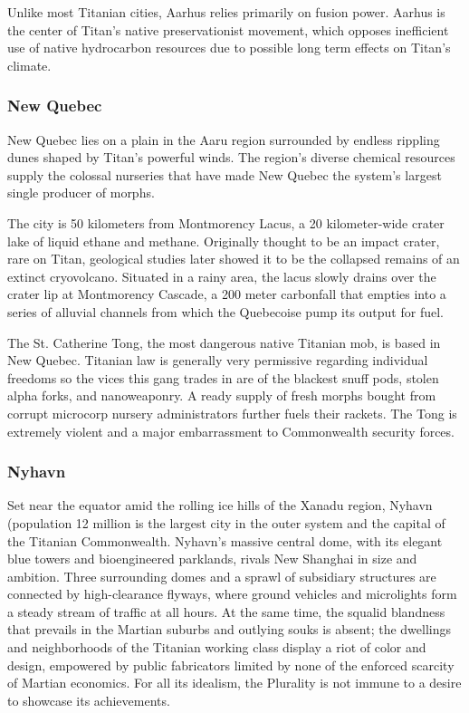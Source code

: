 Unlike most Titanian cities, Aarhus relies primarily 
on fusion power. Aarhus is the center of Titan's native 
preservationist movement, which opposes inefficient 
use of native hydrocarbon resources due to possible 
long term effects on Titan's climate.

\subsubsection{New Quebec}

New Quebec lies on a plain in the Aaru region surrounded
by endless rippling dunes shaped by Titan's
powerful winds. The region's diverse chemical resources
supply the colossal nurseries that have made New
Quebec the system's largest single producer of morphs.

The city is 50 kilometers from Montmorency Lacus, 
a 20 kilometer-wide crater lake of liquid ethane and 
methane. Originally thought to be an impact crater, 
rare on Titan, geological studies later showed it to be 
the collapsed remains of an extinct cryovolcano. Situated
in a rainy area, the lacus slowly drains over the
crater lip at Montmorency Cascade, a 200 meter carbonfall
that empties into a series of alluvial channels
from which the Quebecoise pump its output for fuel.

The St. Catherine Tong, the most dangerous native 
Titanian mob, is based in New Quebec. Titanian law 
is generally very permissive regarding individual freedoms
so the vices this gang trades in are of the blackest
snuff pods, stolen alpha forks, and nanoweaponry.
A ready supply of fresh morphs bought from corrupt 
microcorp nursery administrators further fuels their 
rackets. The Tong is extremely violent and a major 
embarrassment to Commonwealth security forces.

\subsubsection{Nyhavn}

Set near the equator
amid the rolling ice
hills of the Xanadu region, 
Nyhavn (population 12 million
is the largest city in the outer
system and the capital of the Titanian 
Commonwealth. Nyhavn's massive central
dome, with its elegant blue towers and
bioengineered parklands, rivals New Shanghai 
in size and ambition. Three surrounding domes 
and a sprawl of subsidiary structures are connected 
by high-clearance flyways, where ground vehicles 
and microlights form a steady stream of traffic at all 
hours. At the same time, the squalid blandness that 
prevails in the Martian suburbs and outlying souks 
is absent; the dwellings and neighborhoods of the 
Titanian working class display a riot of color and 
design, empowered by public fabricators limited by 
none of the enforced scarcity of Martian economics. 
For all its idealism, the Plurality is not immune to a 
desire to showcase its achievements.

